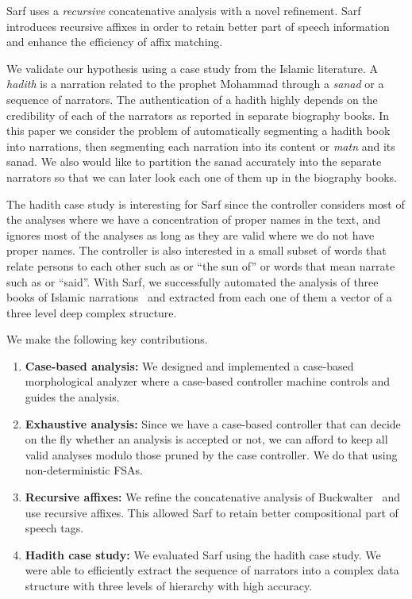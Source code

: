 \documentclass[11pt,letterpaper]{article}
\begin{document}
Sarf uses a {\em recursive} concatenative analysis with a novel 
refinement. 
Sarf introduces recursive affixes in order to
retain better part of speech information and enhance the 
efficiency of affix matching. 

We validate our hypothesis using a case study from the Islamic 
literature. 
A {\em hadith} is a narration related to the prophet Mohammad
through a {\em sanad} or a sequence of narrators. 
The authentication of a hadith highly depends on the credibility
of each of the narrators as reported in separate biography 
books. 
In this paper we consider the problem of automatically segmenting
a hadith book into narrations, then segmenting each narration into
its content or {\em matn} and its sanad.
We also would like to partition the sanad accurately into the 
separate narrators so that we can later look each one of them 
up in the biography books. 

The hadith case study is interesting for Sarf since the controller
considers most of the analyses where we have a concentration
of proper names in the text, and ignores most of the analyses as long 
as they are valid where we do not have proper names. 
The controller is also interested in a small subset of words 
that relate persons to each other such as  or ``the sun of''
or words that mean narrate such as  or ``said''. 
With Sarf, we successfully automated the analysis of 
three books of Islamic narrations~\cite{IbnHanbal,AlTousi,AlKulayni}
and extracted from each one of them a vector of a three level deep
complex structure. 


We make the following key contributions. 
\begin{enumerate}
\item {\bf Case-based analysis:}  We designed and implemented
a case-based morphological analyzer where a case-based controller
machine controls and guides the analysis. 
\item {\bf Exhaustive analysis:} Since we have a case-based 
controller that can decide on the fly whether an analysis is 
accepted or not, we can afford to keep all valid analyses modulo
those pruned by the case controller. 
We do that using non-deterministic FSAs. 
\item {\bf Recursive affixes:}
We refine the concatenative analysis of 
Buckwalter~  and use recursive affixes. 
This allowed Sarf to retain better compositional part of speech
tags.
\item {\bf Hadith case study:}
We evaluated Sarf using the hadith case study. We were able to
efficiently extract the sequence of narrators into a complex
data structure with three levels of hierarchy with high accuracy. 
\end{enumerate}
\end{document}
